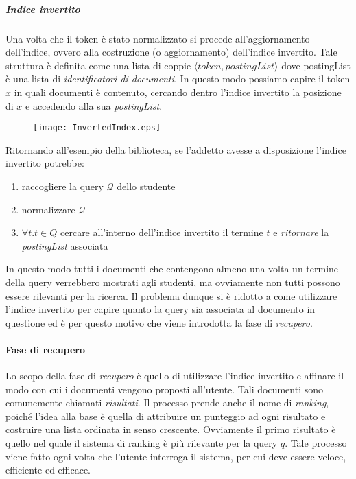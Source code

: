\subparagraph{Indice invertito}
Una volta che il token è stato normalizzato si procede all'aggiornamento dell'indice, ovvero alla costruzione (o aggiornamento)
dell'indice invertito. Tale struttura è definita come una lista di coppie
$\langle token, postingList \rangle$ dove postingList è una lista di \textit{identificatori di documenti}.
In questo modo possiamo capire il token $x$ in quali documenti è contenuto, cercando dentro l'indice
invertito la posizione di $x$ e accedendo alla sua \textit{postingList}.

\begin{figure}[h]
	\label{fig:invertedIndex}
	\centering
	\texttt{[image: InvertedIndex.eps]}
\end{figure}

\pagebreak

Ritornando all'esempio della biblioteca, se l'addetto avesse a disposizione l'indice invertito potrebbe:
\begin{enumerate}
	\item raccogliere la query $\mathcal{Q}$ dello studente
	\item normalizzare $\mathcal{Q}$
	\item $\forall t.t\in Q$ cercare all'interno dell'indice invertito il termine $t$ e \textit{ritornare} la \textit{postingList} associata
\end{enumerate}

In questo modo tutti i documenti che contengono almeno una volta un termine della query verrebbero mostrati
agli studenti, ma ovviamente non tutti possono essere rilevanti per la ricerca. Il problema dunque si è ridotto
a come utilizzare l'indice invertito per capire quanto la query sia associata al documento in questione ed è per questo
motivo che viene introdotta la fase di \textit{recupero}.

\paragraph{Fase di recupero}
Lo scopo della fase di \textit{recupero} è quello di utilizzare l'indice invertito e affinare il modo con cui
i documenti vengono proposti all'utente. Tali documenti sono comunemente chiamati \textit{risultati}.
Il processo prende anche il nome di \textit{ranking}, poiché l'idea alla base è quella di attribuire
un punteggio ad ogni risultato e costruire una lista ordinata in senso crescente.
Ovviamente il primo risultato è quello nel quale il sistema di ranking è più
rilevante per la query $q$. Tale processo viene fatto ogni volta che l'utente
interroga il sistema, per cui deve essere veloce, efficiente ed efficace.

